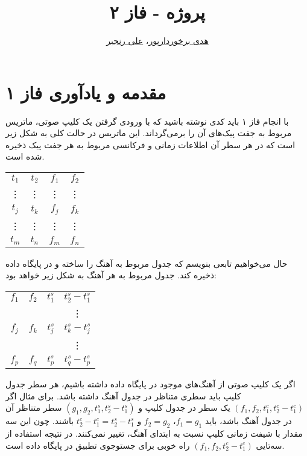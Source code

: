 \documentclass{utsignal}
\title{پروژه - فاز ۲}
\author{\href{mailto:h.barkhordarpour@ut.ac.ir?subject=[SS\%20S98 A2]}{هدی برخوردارپور}، 
\href{mailto:ranjbar.ali@ut.ac.ir?subject=[SS\%20S98 A2]\%20}{علی رنجبر}}
\begin{document}
	\maketitle
	\section*{مقدمه و یادآوری فاز ۱}
	با انجام فاز ۱ باید کدی نوشته باشید که با ورودی گرفتن یک کلیپ صوتی، ماتریس مربوط به جفت پیک‌های آن را برمی‌گرداند. این ماتریس در حالت کلی به شکل زیر است که در هر سطر آن اطلاعات زمانی و فرکانسی مربوط به هر جفت پیک ذخیره شده است.
	\begin{center}
		\begin{latin}
			\begin{tabular}{|c|c|c|c|}
				$t_1$ & $t_2$ & $f_1$ & $f_2$ \\
				\vdots&\vdots&\vdots&\vdots\\
				$t_j$ & $t_k$ & $f_j$ & $f_k$ \\
				\vdots&\vdots&\vdots&\vdots\\
				$t_m$ & $t_n$ & $f_m$ & $f_n$ \\
			\end{tabular}
		\end{latin}
	\end{center}
	حال می‌خواهیم تابعی بنویسم که جدول مربوط به آهنگ را ساخته و در پایگاه داده ذخیره کند. جدول مربوط به هر آهنگ به شکل زیر خواهد بود:
	\begin{center}
		\begin{latin}
			\begin{tabular}{|c|c|c|c|}
				$f_1$ & $f_2$ & $t_1^s$ & $t_2^s-t_1^s$\\
				&&&\vdots\\
				$f_j$ & $f_k$ & $t_j^s$ & $t_k^s-t_j^s$\\
				&&&\vdots\\
				$f_p$ & $f_q$ & $t_p^s$ & $t_q^s-t_p^s$\\
			\end{tabular}
		\end{latin}
	\end{center}
	اگر یک کلیپ صوتی از آهنگ‌های موجود در پایگاه داده داشته باشیم، هر سطر جدول کلیپ باید سطری متناظر در جدول آهنگ داشته باشد. برای مثال اگر $(f_1, f_2, t_1^c, t_2^c-t_1^c)$ یک سطر در جدول کلیپ و $(g_1, g_2, t_1^s, t_2^s-t_1^s)$ سطر متناظر آن در جدول آهنگ باشد، باید $f_1=g_1$، $f_2=g_2$ و $t_2^c-t_1^c=t_2^s-t_1^s$ باشند. چون این سه مقدار با شیفت زمانی کلیپ نسبت به ابتدای آهنگ، تغییر نمی‌کنند. در نتیجه استفاده از سه‌تایی $(f_1, f_2, t_2^c-t_1^c)$ راه خوبی برای جستوجوی تطبیق در پایگاه داده است.
	
\end{document}
